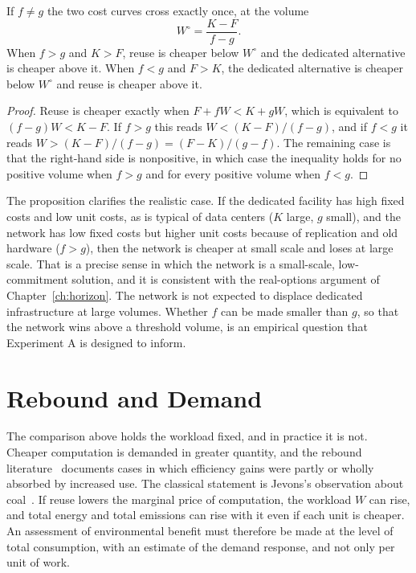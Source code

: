 \begin{proposition}
\label{prop:crossover}
If $f\ne g$ the two cost curves cross exactly once, at the volume
\[
W^{\circ}=\frac{K-F}{f-g}.
\]
When $f>g$ and $K>F$, reuse is cheaper below $W^{\circ}$ and the dedicated alternative is cheaper above it. When $f<g$ and $F>K$, the dedicated alternative is cheaper below $W^{\circ}$ and reuse is cheaper above it.
\end{proposition}

\begin{proof}
Reuse is cheaper exactly when $F+fW<K+gW$, which is equivalent to $(f-g)W<K-F$. If $f>g$ this reads $W<(K-F)/(f-g)$, and if $f<g$ it reads $W>(K-F)/(f-g)=(F-K)/(g-f)$. The remaining case is that the right-hand side is nonpositive, in which case the inequality holds for no positive volume when $f>g$ and for every positive volume when $f<g$.
\end{proof}

The proposition clarifies the realistic case. If the dedicated facility has high fixed costs and low unit costs, as is typical of data centers ($K$ large, $g$ small), and the network has low fixed costs but higher unit costs because of replication and old hardware ($f>g$), then the network is cheaper at small scale and loses at large scale. That is a precise sense in which the network is a small-scale, low-commitment solution, and it is consistent with the real-options argument of Chapter~\ref{ch:horizon}. The network is not expected to displace dedicated infrastructure at large volumes. Whether $f$ can be made smaller than $g$, so that the network wins above a threshold volume, is an empirical question that Experiment A is designed to inform.

\section{Rebound and Demand}

The comparison above holds the workload fixed, and in practice it is not. Cheaper computation is demanded in greater quantity, and the rebound literature~\cite{sorrell2009} documents cases in which efficiency gains were partly or wholly absorbed by increased use. The classical statement is Jevons's observation about coal~\cite{jevons1865}. If reuse lowers the marginal price of computation, the workload $W$ can rise, and total energy and total emissions can rise with it even if each unit is cheaper. An assessment of environmental benefit must therefore be made at the level of total consumption, with an estimate of the demand response, and not only per unit of work.

